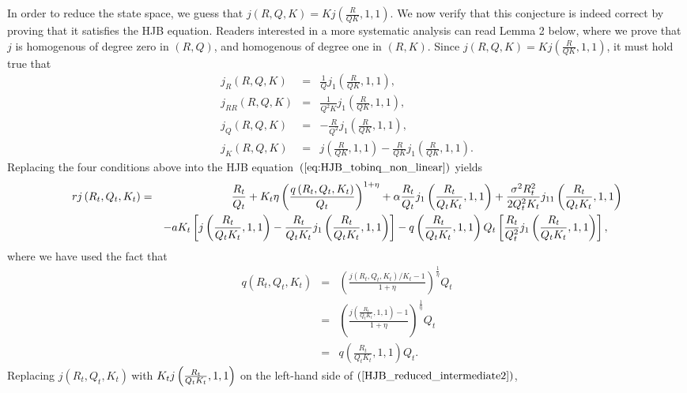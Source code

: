 \documentclass[12pt, a4paper]{article}
\begin{document}
In order to reduce the state space, we guess that $j\left( R,Q,K\right)
=Kj\left( \frac{R}{QK},1,1\right)$. We now verify that this conjecture is indeed correct by proving
that it satisfies the HJB equation. Readers interested in a more systematic analysis
can read Lemma 2 below, where we prove that $j$ is homogenous of degree zero in $\left(
R,Q\right)$, and homogenous of degree one in $\left(
R,K\right)$. Since $j\left( R,Q,K\right)
=Kj\left( \frac{R}{QK},1,1\right)$, it must hold true that
\begin{eqnarray*}
j_{R}\left( R,Q,K\right)  &=&\frac{1}{Q}j_{1}\left( \frac{R}{QK},1,1\right) ,
\\
j_{RR}\left( R,Q,K\right)  &=&\frac{1}{Q^{2}K}j_{1}\left( \frac{R}{QK}%
,1,1\right) , \\
j_{Q}\left( R,Q,K\right)  &=&-\frac{R}{Q^{2}}j_{1}\left( \frac{R}{QK}%
,1,1\right) , \\
j_{K}\left( R,Q,K\right)  &=&j\left( \frac{R}{QK},1,1\right) -\frac{R}{QK}%
j_{1}\left( \frac{R}{QK},1,1\right) .
\end{eqnarray*}%
Replacing the four conditions above into the HJB equation\ $\left( \ref%
{eq:HJB_tobinq_non_linear}\right) \ $yields%
{ \scriptsize
\begin{eqnarray}
rj\left( R_{t},Q_{t},K_{t}\right)  &=&\frac{R_{t}}{Q_{t}}+K_{t}\eta \left(
\frac{q\left( R_{t},Q_{t},K_{t}\right) }{Q_{t}}\right) ^{1+\eta }+\alpha
\frac{R_{t}}{Q_{t}}j_{1}\left( \frac{R_{t}}{Q_{t}K_{t}},1,1\right) +\frac{%
\sigma ^{2}R_{t}^{2}}{2Q_{t}^{2}K_{t}}j_{11}\left( \frac{R_{t}}{Q_{t}K_{t}}%
,1,1\right)   \notag \\
&&-aK_{t}\left[ j\left( \frac{R_{t}}{Q_{t}K_{t}},1,1\right) -\frac{R_{t}}{%
Q_{t}K_{t}}j_{1}\left( \frac{R_{t}}{Q_{t}K_{t}},1,1\right) \right] -q\left(
\frac{R_{t}}{Q_{t}K_{t}},1,1\right) Q_{t}\left[ \frac{R_{t}}{Q_{t}^{2}}%
j_{1}\left( \frac{R_{t}}{Q_{t}K_{t}},1,1\right) \right],~~~~\label{HJB_reduced_intermediate2}
\end{eqnarray}%
}
where we have used the fact that%
\begin{eqnarray*}
q\left( R_{t},Q_{t},K_{t}\right)  &=&\left( \frac{j\left(
R_{t},Q_{t},K_{t}\right) /K_{t}-1}{1+\eta }\right) ^{\frac{1}{\eta }}Q_{t} \\
&=&\left( \frac{j\left( \frac{R_{t}}{Q_{t}K_{t}},1,1\right) -1}{1+\eta }%
\right) ^{\frac{1}{\eta }}Q_{t} \\
&=&q\left( \frac{R_{t}}{Q_{t}K_{t}},1,1\right) Q_{t}.
\end{eqnarray*}
Replacing $%
j\left( R_{t},Q_{t},K_{t}\right) \ $with$\ K_{t}j\left( \frac{R_{t}}{%
Q_{t}K_{t}},1,1\right) $ on the left-hand side of $\left( \ref{HJB_reduced_intermediate2}\right) $,
\end{document}
